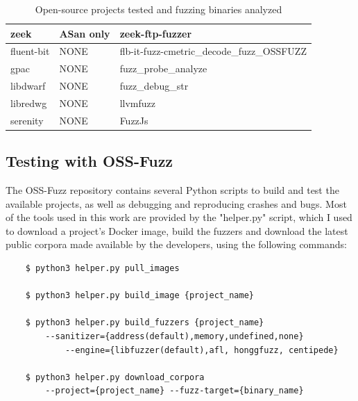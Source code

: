 \begin{table}[h!]
{\begin{tabular}{|l|l|l|}
zeek             & ASan only                & zeek-ftp-fuzzer           \\ 
\hline
fluent-bit       & NONE                & flb-it-fuzz-cmetric\_decode\_fuzz\_OSSFUZZ         \\
gpac             & NONE                & fuzz\_probe\_analyze                               \\
libdwarf         & NONE                & fuzz\_debug\_str                                   \\
libredwg         & NONE                & llvmfuzz                                           \\
serenity         & NONE                & FuzzJs                                             \\
\hline
\end{tabular}}
\vspace{10pt}
\caption{Open-source projects tested and fuzzing binaries analyzed}
\label{fuzzing-table}
\end{table}





\newpage
\subsection{Testing with OSS-Fuzz} \label{test}
The OSS-Fuzz repository contains several Python scripts to build and test the available projects, as well as debugging and reproducing crashes and bugs. Most of the tools used in this work are provided by the "helper.py" script, which I used to download a project's Docker image, build the fuzzers and download the latest public corpora made available by the developers, using the following commands:
\begin{verbatim}
    $ python3 helper.py pull_images 

    $ python3 helper.py build_image {project_name}

    $ python3 helper.py build_fuzzers {project_name}
        --sanitizer={address(default),memory,undefined,none} 
            --engine={libfuzzer(default),afl, honggfuzz, centipede}
        
    $ python3 helper.py download_corpora 
        --project={project_name} --fuzz-target={binary_name}
\end{verbatim}

